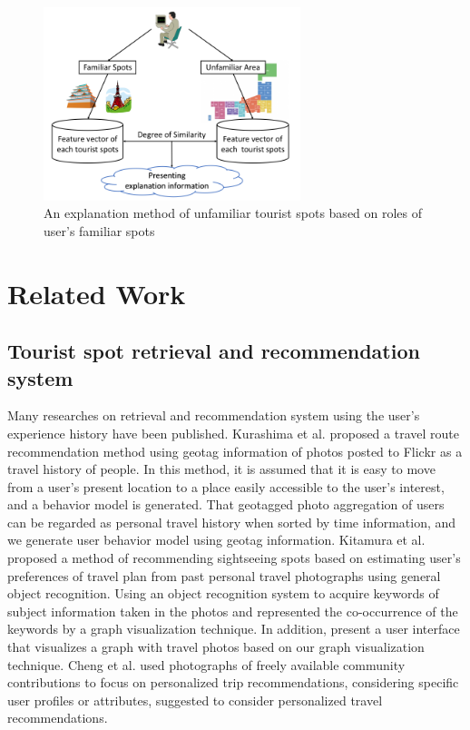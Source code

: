 \documentclass[journal]{IAENGtran}
\begin{document}
\begin{figure}[t]
  \begin{center}
    \includegraphics[clip,width=7.5cm,bb=0 0 720 540]{picture/Photo_Image_eng.png}
    \caption{An explanation method of unfamiliar tourist spots based on roles of user's familiar spots}
    \label{fig:Photo_Image}
   \end{center}
\end{figure}

\section{Related Work}
\label{sec:Related Work}
\subsection{Tourist spot retrieval and recommendation system}
\label{subsec:Tourist spot retrieval and recommendation system}

Many researches on retrieval and recommendation system using the user's experience history have been published.
Kurashima et al.\cite{Codd01} proposed a travel route recommendation method using geotag information of photos posted to Flickr as a travel history of people.
In this method, it is assumed that it is easy to move from a user's present location to a place easily accessible to the user's interest, and a behavior model is generated.
That geotagged photo aggregation of users can be regarded as personal travel history when sorted by time information, and we generate user behavior model using geotag information.
Kitamura et al.\cite{Codd02} proposed a method of recommending sightseeing spots based on estimating user's preferences of travel plan from past personal travel photographs using general object recognition.
Using an object recognition system to acquire keywords of subject information taken in the photos and represented the co-occurrence of the keywords by a graph visualization technique.
In addition, present a user interface that visualizes a graph with travel photos based on our graph visualization technique.
Cheng et al.\cite{Codd03} used photographs of freely available community contributions to focus on personalized trip recommendations, considering specific user profiles or attributes, suggested to consider personalized travel recommendations.
\end{document}
